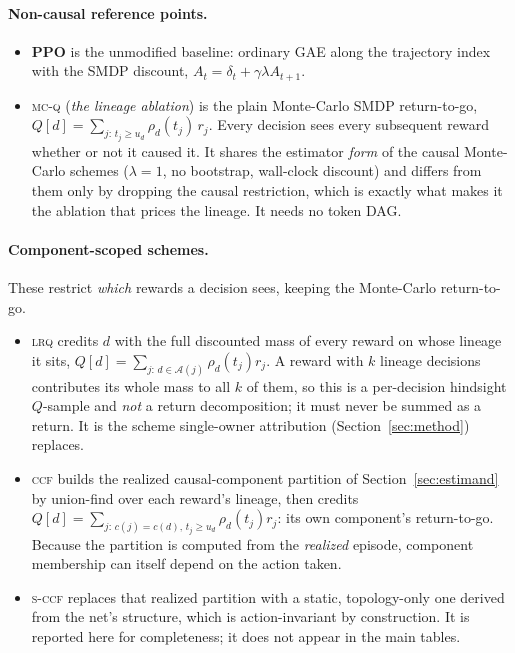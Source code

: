 \documentclass[review,authoryear,3p,times]{elsarticle}
\newcommand{\ccf}{\textsc{ccf}}
\newcommand{\sccf}{\textsc{s-ccf}}
\newcommand{\mcq}{\textsc{mc-q}}
\newcommand{\lrq}{\textsc{lrq}}
\newcommand{\Ascr}{\mathcal{A}}
\begin{document}
\paragraph{Non-causal reference points.}
\begin{itemize}
\item \textbf{PPO} is the unmodified baseline: ordinary GAE along the trajectory
index with the SMDP discount, $A_t=\delta_t+\gamma\lambda A_{t+1}$.
\item \mcq{} (\emph{the lineage ablation}) is the plain Monte-Carlo SMDP
return-to-go, $Q[d]=\sum_{j:\,t_j\ge u_d}\rho_d(t_j)\,r_j$. Every decision sees
every subsequent reward whether or not it caused it. It shares the estimator
\emph{form} of the causal Monte-Carlo schemes ($\lambda=1$, no bootstrap,
wall-clock discount) and differs from them only by dropping the causal
restriction, which is exactly what makes it the ablation that prices the
lineage. It needs no token DAG.
\end{itemize}

\paragraph{Component-scoped schemes.} These restrict \emph{which} rewards a
decision sees, keeping the Monte-Carlo return-to-go.
\begin{itemize}
\item \lrq{} credits $d$ with the full discounted mass of every reward on whose
lineage it sits, $Q[d]=\sum_{j:\,d\in\Ascr(j)}\rho_d(t_j)r_j$. A reward with $k$
lineage decisions contributes its whole mass to all $k$ of them, so this is a
per-decision hindsight $Q$-sample and \emph{not} a return decomposition; it must
never be summed as a return. It is the scheme single-owner attribution
(Section~\ref{sec:method}) replaces.
\item \ccf{} builds the realized causal-component partition of
Section~\ref{sec:estimand} by union-find over each reward's lineage, then credits
$Q[d]=\sum_{j:\,c(j)=c(d),\,t_j\ge u_d}\rho_d(t_j)r_j$: its own component's
return-to-go. Because the partition is computed from the \emph{realized}
episode, component membership can itself depend on the action taken.
\item \sccf{} replaces that realized partition with a static, topology-only one
derived from the net's structure, which is action-invariant by construction. It
is reported here for completeness; it does not appear in the main tables.
\end{itemize}
\end{document}
